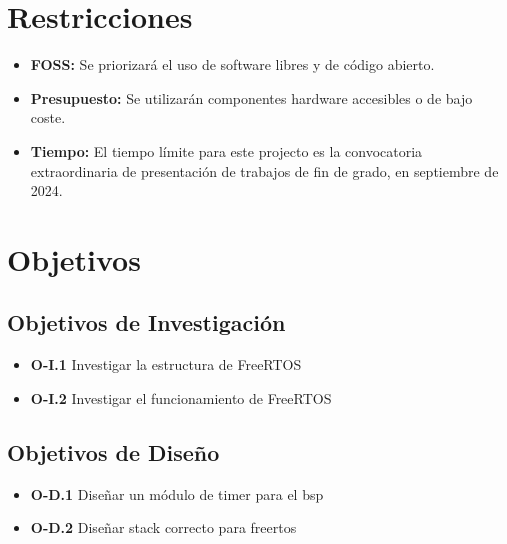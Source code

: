 \section{Restricciones}
\begin{itemize}
    \item \textbf{FOSS:} Se priorizará el uso de software libres y de código abierto.
    \item \textbf{Presupuesto:} Se utilizarán componentes hardware accesibles o de bajo coste.
    \item \textbf{Tiempo:} El tiempo límite para este projecto es la convocatoria extraordinaria de presentación de trabajos de fin de grado, en septiembre de 2024.
\end{itemize}

\section{Objetivos}
\subsection{Objetivos de Investigación}
\begin{itemize}
    \item \textbf{O-I.1} Investigar la estructura de FreeRTOS
    \item \textbf{O-I.2} Investigar el funcionamiento de FreeRTOS
\end{itemize}

\subsection{Objetivos de Diseño}
\begin{itemize}
    \item \textbf{O-D.1} Diseñar un módulo de timer para el bsp
    \item \textbf{O-D.2} Diseñar stack correcto para freertos
\end{itemize}
